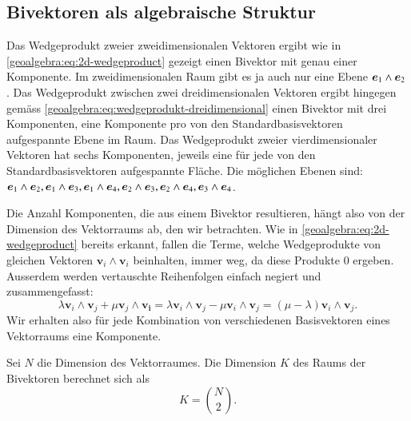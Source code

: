 \subsection{Bivektoren als algebraische Struktur}
Das Wedgeprodukt zweier zweidimensionalen Vektoren ergibt wie in \eqref{geoalgebra:eq:2d-wedgeproduct}
gezeigt einen Bivektor mit genau einer Komponente. Im zweidimensionalen Raum gibt es ja auch nur eine
Ebene $\eone \wedge \etwo$. 
Das Wedgeprodukt zwischen zwei dreidimensionalen Vektoren ergibt hingegen
gemäss \eqref{geoalgebra:eq:wedgeprodukt-dreidimensional} einen
Bivektor mit drei Komponenten, eine Komponente pro von den Standardbasisvektoren aufgespannte
Ebene im Raum.
Das Wedgeprodukt zweier vierdimensionaler Vektoren hat sechs Komponenten,
jeweils eine für jede von den Standardbasisvektoren aufgespannte Fläche. Die möglichen Ebenen sind:
$\eone \wedge \etwo, \eone \wedge \ethree, \eone \wedge \boldsymbol{e}_{4}, \etwo \wedge \ethree, \etwo \wedge \boldsymbol{e}_{4}, \ethree \wedge \boldsymbol{e}_{4}$.

Die Anzahl Komponenten, die aus einem Bivektor resultieren, hängt also von der Dimension des Vektorraums ab, den wir betrachten.
Wie in \eqref{geoalgebra:eq:2d-wedgeproduct} bereits erkannt, fallen die Terme, welche Wedgeprodukte von gleichen Vektoren $\boldsymbol{v}_i \wedge \boldsymbol{v}_i$ beinhalten,
immer weg, da diese Produkte $0$ ergeben. Ausserdem werden vertauschte Reihenfolgen einfach negiert und zusammengefasst: 
\begin{equation*}
  \lambda \boldsymbol{v}_i \wedge \boldsymbol{v}_j + \mu \boldsymbol{v}_j \wedge \boldsymbol{v_i} = \lambda \boldsymbol{v}_i \wedge \boldsymbol{v}_j - \mu \boldsymbol{v}_i \wedge \boldsymbol{v}_j = (\mu - \lambda) \boldsymbol{v}_i \wedge \boldsymbol{v}_j.
\end{equation*}
Wir erhalten also für jede Kombination von verschiedenen Basisvektoren eines Vektorraums eine Komponente.
\begin{satz}
Sei $N$ die Dimension des Vektorraumes. Die Dimension $K$ des Raums der Bivektoren berechnet sich als
  \begin{equation}
    \label{geoalgebra:eq:components-bivectors}
    K = \binom{N}{2}.
  \end{equation}
\end{satz}


